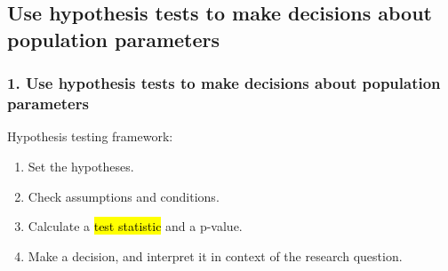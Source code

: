 \documentclass[11pt,containsverbatim,handout,xcolor=xelatex,dvipsnames,table]{beamer}
\begin{document}

\subsection{Use hypothesis tests to make decisions about population parameters}
\label{mi1}


\begin{frame}
\frametitle{1. Use hypothesis tests to make decisions about population parameters}

Hypothesis testing framework:

\begin{enumerate}

\item Set the hypotheses.

\item Check assumptions and conditions.

\item Calculate a \hl{test statistic} and a p-value.

\item Make a decision, and interpret it in context of the research question.

\end{enumerate}

\end{frame}

\end{document}
